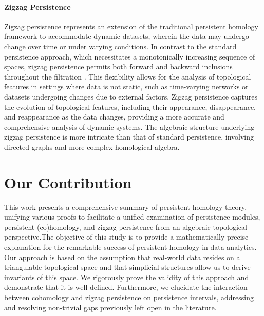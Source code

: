 \paragraph*{Zigzag Persistence}
Zigzag persistence represents an extension of the traditional persistent homology framework to accommodate dynamic datasets, wherein the data may undergo change over time or under varying conditions. In contrast to the standard persistence approach, which necessitates a monotonically increasing sequence of spaces, zigzag persistence permits both forward and backward inclusions throughout the filtration \cite{Carlsson2010}. This flexibility allows for the analysis of topological features in settings where data is not static, such as time-varying networks or datasets undergoing changes due to external factors. Zigzag persistence captures the evolution of topological features, including their appearance, disappearance, and reappearance as the data changes, providing a more accurate and comprehensive analysis of dynamic systems. The algebraic structure underlying zigzag persistence is more intricate than that of standard persistence, involving directed graphs and more complex homological algebra.

\section{Our Contribution}
This work presents a comprehensive summary of persistent homology theory, unifying various proofs to facilitate a unified examination of persistence modules, persistent (co)homology, and zigzag persistence from an algebraic-topological perspective.The objective of this study is to provide a mathematically precise explanation for the remarkable success of persistent homology in data analytics. Our approach is based on the assumption that real-world data resides on a triangulable topological space and that simplicial structures allow us to derive invariants of this space. We rigorously prove the validity of this approach and demonstrate that it is well-defined. Furthermore, we elucidate the interaction between cohomology and zigzag persistence on persistence intervals, addressing and resolving non-trivial gaps previously left open in the literature.